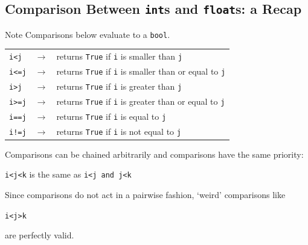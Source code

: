 \documentclass[t,handout,9pt]{beamer}
\begin{document}
\subsection{Comparison Between \texttt{int}s and \texttt{float}s: a Recap}
\begin{frame}%
\vfill
\begin{block}{Note}
Comparisons below evaluate to a \texttt{bool}.
\end{block}
\vfill
\begin{table}[]
\begin{tabular}{lll}
\texttt{i<j}  & $\rightarrow$  & returns \texttt{True} if \texttt{i} is smaller than \texttt{j}\\
\texttt{i<=j} &  $\rightarrow$ &  returns \texttt{True} if \texttt{i} is smaller than or equal to \texttt{j}\\
\texttt{i>j}  & $\rightarrow$  & returns \texttt{True} if \texttt{i} is greater than \texttt{j}\\
\texttt{i>=j} &  $\rightarrow$ &  returns \texttt{True} if \texttt{i} is greater than or equal to \texttt{j}\\
\texttt{i==j} &  $\rightarrow$ &  returns \texttt{True} if \texttt{i} is equal to \texttt{j}\\
\texttt{i!=j} &  $\rightarrow$ &  returns \texttt{True} if \texttt{i} is not equal to \texttt{j}\\
\end{tabular}
\end{table}
\vfill
Comparisons can be chained arbitrarily and comparisons have the same priority:\\
\begin{center}\texttt{i<j<k} is the same as \texttt{i<j and j<k}\end{center}
Since comparisons do not act in a pairwise fashion, `weird' comparisons like
\begin{center}\texttt{i<j>k}\end{center}
are perfectly valid.
\vfill
\end{frame}
%
\end{document}
